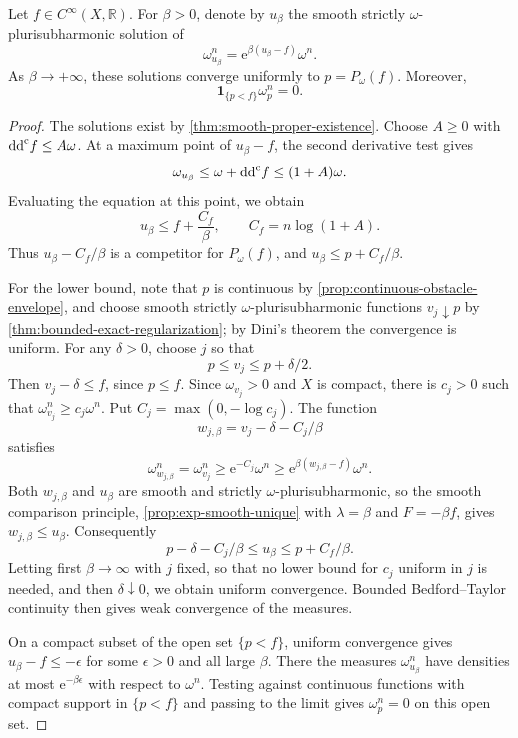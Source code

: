 \begin{proposition}\label{prop:smooth-obstacle-support}
Let $f\in C^\infty(X,\mathbb R)$. For $\beta>0$, denote by $u_\beta$ the smooth strictly $\omega$-plurisubharmonic solution of
\[
 \omega_{u_\beta}^n=\mathrm{e}^{\beta(u_\beta-f)}\omega^n.
\]
As $\beta\to+\infty$, these solutions converge uniformly to $p=P_\omega(f)$. Moreover,
\[
 \mathbf1_{\{p<f\}}\omega_p^n=0.
\]
\end{proposition}
\begin{proof}
The solutions exist by \cref{thm:smooth-proper-existence}. Choose $A\geq0$ with $\mathrm{dd}^{\mathrm{c}} f\leq A\omega$. At a maximum point of $u_\beta-f$, the second derivative test gives
\[
 \omega_{u_\beta}\leq\omega+\mathrm{dd}^{\mathrm{c}} f\leq(1+A)\omega.
\]
Evaluating the equation at this point, we obtain
\[
 u_\beta\leq f+\frac{C_f}{\beta},\qquad C_f=n\log(1+A).
\]
Thus $u_\beta-C_f/\beta$ is a competitor for $P_\omega(f)$, and
$u_\beta\leq p+C_f/\beta$.

For the lower bound, note that $p$ is continuous by \cref{prop:continuous-obstacle-envelope}, and choose smooth strictly $\omega$-plurisubharmonic functions $v_j\downarrow p$ by \cref{thm:bounded-exact-regularization}; by Dini's theorem the convergence is uniform. For any $\delta>0$, choose $j$ so that
\[
 p\leq v_j\leq p+\delta/2.
\]
Then $v_j-\delta\leq f$, since $p\leq f$. Since $\omega_{v_j}>0$ and $X$ is compact, there is $c_j>0$ such that $\omega_{v_j}^n\geq c_j\omega^n$. Put $C_j=\max(0,-\log c_j)$. The function
\[
 w_{j,\beta}=v_j-\delta-C_j/\beta
\]
satisfies
\[
 \omega_{w_{j,\beta}}^n=\omega_{v_j}^n
 \geq \mathrm{e}^{-C_j}\omega^n
 \geq \mathrm{e}^{\beta(w_{j,\beta}-f)}\omega^n.
\]
Both $w_{j,\beta}$ and $u_\beta$ are smooth and strictly $\omega$-plurisubharmonic, so the smooth comparison principle, \cref{prop:exp-smooth-unique} with $\lambda=\beta$ and $F=-\beta f$, gives $w_{j,\beta}\leq u_\beta$. Consequently
\[
 p-\delta-C_j/\beta\leq u_\beta\leq p+C_f/\beta.
\]
Letting first $\beta\to\infty$ with $j$ fixed, so that no lower bound for $c_j$ uniform in $j$ is needed, and then $\delta\downarrow0$, we obtain uniform convergence. Bounded Bedford--Taylor continuity then gives weak convergence of the measures.

On a compact subset of the open set $\{p<f\}$, uniform convergence gives $u_\beta-f\leq-\epsilon$ for some $\epsilon>0$ and all large $\beta$. There the measures $\omega_{u_\beta}^n$ have densities at most $\mathrm{e}^{-\beta\epsilon}$ with respect to $\omega^n$. Testing against continuous functions with compact support in $\{p<f\}$ and passing to the limit gives $\omega_p^n=0$ on this open set.
\end{proof}

